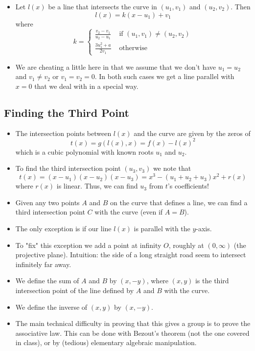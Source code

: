 \documentclass[a4paper]{scrartcl}
\begin{document}
\begin{itemize}
\item Let $l(x)$ be a line that intersects the curve in $(u_1,v_1)$ and $(u_2,v_2)$. Then $$l(x) = k(x-u_1) + v_1$$ where 
$$k = 
\left\{
\begin{array}{ll}
\frac{v_2-v_1}{u_2-u_1} & \text{\ if \ } (u_1,v_1) \neq (u_2,v_2)\\
\frac{3u_1^2 + a}{2v_1} & \text{\ otherwise \ }
\end{array}
\right.$$
\item We are cheating a little here in that we assume that we don't have $u_1 = u_2$ and $v_1 \neq v_2$ or $v_1 = v_2 = 0$. In both such cases we get a line parallel with $x = 0$ that we deal with in a special way.
\end{itemize}

\subsection*{Finding the Third Point}

\begin{itemize}
\item The intersection points between $l(x)$ and the curve are given by the zeros of $$t(x) = g(l(x),x) = f(x) - l(x)^2$$ which is a cubic polynomial with known roots $u_1$ and $u_2$.
\item To find the third intersection point $(u_3,v_3)$ we note that $$t(x) = (x-u_1)(x-u_2)(x-u_3) = x^3 - (u_1 + u_2 + u_3)x^2 + r(x)$$ where $r(x)$ is linear. Thus, we can find $u_3$ from $t$'s coefficients!
\item Given any two points $A$ and $B$ on the curve that defines a line, we can find a third intersection point $C$ with the curve (even if $A = B$).
\item The only exception is if our line $l(x)$ is parallel with the $y$-axis.
\item To "fix" this exception we add a point at infinity $O$, roughly at $(0,\infty)$ (the projective plane). Intuition: the side of a long straight road seem to intersect infinitely far away.
\item We define the sum of $A$ and $B$ by $(x, -y)$, where $(x,y)$ is the third intersection point of the line defined by $A$ and $B$  with the curve.
\item We define the inverse of $(x,y)$ by $(x,-y)$.
\item The main technical difficulty in proving that this gives a group is to prove the associative law. This can be done with Bezout's theorem (not the one covered in class), or by (tedious) elementary algebraic manipulation.
\end{itemize}
\end{document}
